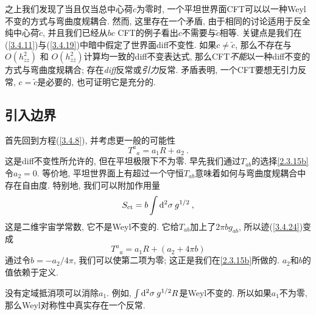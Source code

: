 之上我们发现了当且仅当总中心荷$c$为零时, 一个平坦世界面CFT可以以一种Weyl不变的方式与弯曲度规耦合. 然而, 这里存在一个矛盾, 由于相同的讨论适用于反全纯中心荷$\tilde{c}$, 并且我们已经从$bc$ CFT的例子看出$c$不需要与$\tilde{c}$相等. 关键点是我们在(\ref{3.4.11})与(\ref{3.4.19})中暗中假定了世界面diff不变性. 如果$c\neq \tilde{c}$, 那么不存在与$O(h_{z z}^{2})$ 和 $O(h_{\bar{z} \bar{z}}^{2})$计算均一致的diff不变表达式, 那么CFT\emph{不能}以一种diff不变的方式与弯曲度规耦合; 存在\emph{diff}反常或\emph{引力}反常. 矛盾表明, 一个CFT要想无引力反常, $c= \tilde{c}$是必要的, 也可证明它是充分的.

\subsection*{引入边界}

首先回到方程(\ref{3.4.8}), 并考虑更一般的可能性
\begin{equation}\label{3.4.24}
	T^{a}{}_{a}=a_{1} R+a_{2} \:. 
\end{equation}
这是diff不变性所允许的, 但在平坦极限下不为零. 早先我们通过$T_{ab}$的选择\eqref{2.3.15b}令$a_2=0$. 等价地, 平坦世界面上有超过一个守恒$T_{ab}$意味着如何与弯曲度规耦合中存在自由度. 特别地, 我们可以附加作用量
\begin{equation}
S_{\mathrm{ct}}=b \int \mathrm{d}^{2} \sigma \: g^{1 / 2} \:, \label{3.4.25}
\end{equation}
这是二维宇宙学常数, 它不是Weyl不变的. 它给$T_{ab}$加上了$2 \pi b g_{a b}$, 所以迹(\ref{3.4.24})变成
\begin{equation}
	T^{a}{}_{a}=a_{1} R+\left(a_{2}+4 \pi b\right)
\end{equation}
通过令$b=-a_{2} / 4 \pi$, 我们可以使第二项为零; 这正是我们在\eqref{2.3.15b}所做的. $a_2$和$b$的值依赖于定义.

没有定域抵消项可以消除$a_1$. 例如, $\int \mathrm{d}^{2} \sigma\: g^{1 / 2} R$是Weyl不变的. 所以如果$a_1$不为零, 那么Weyl对称性中真实存在一个反常. 

